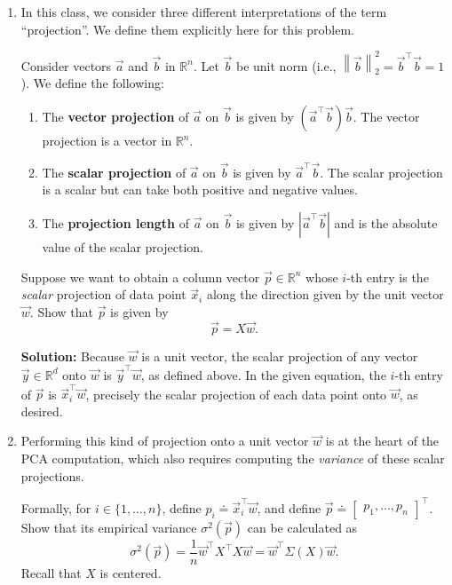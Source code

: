 \documentclass[10pt]{article}
\theoremstyle{definition}
\theoremstyle{plain}
\newcommand{\RR}{\mathbb{R}}
\begin{document}
\begin{enumerate}[label=(\alph*)]
\item In this class, we consider three different interpretations of the term ``projection''. We define them explicitly here for this problem.

Consider vectors $\vec{a}$ and $\vec{b}$ in $\RR^n$. Let $\vec{b}$ be unit norm (i.e., $\left\| \vec{b} \right\|_2^2 = \vec{b}^\top \vec{b} = 1$). We define the following:
\begin{enumerate}[label=\roman*.]
\item The \textbf{vector projection} of $\vec{a}$ on $\vec{b}$ is given by $(\vec{a}^\top \vec{b})\vec{b}$. The vector projection is a vector in $\RR^n$.
\item The \textbf{scalar projection} of $\vec{a}$ on $\vec{b}$ is given by $\vec{a}^\top \vec{b}$. The scalar projection is a scalar but can take both positive and negative values.
\item The \textbf{projection length} of $\vec{a}$ on $\vec{b}$ is given by $\left| \vec{a}^\top \vec{b} \right|$ and is the absolute value of the scalar projection.
\end{enumerate}

Suppose we want to obtain a column vector $\vec{p} \in \RR^n$ whose $i$-th entry is the \textit{scalar} projection of data point $\vec{x}_i$ along the direction given by the unit vector $\vec{w}$. Show that $\vec{p}$ is given by
\begin{equation}
\vec{p} = X\vec{w}.
\end{equation}

\textbf{Solution:} Because $\vec{w}$ is a unit vector, the scalar projection of any vector $\vec{y} \in \RR^d$ onto $\vec{w}$ is $\vec{y}^\top \vec{w}$, as defined above. In the given equation, the $i$-th entry of $\vec{p}$ is $\vec{x}_i^\top \vec{w}$, precisely the scalar projection of each data point onto $\vec{w}$, as desired.

\item Performing this kind of projection onto a unit vector $\vec{w}$ is at the heart of the PCA computation, which also requires computing the \textit{variance} of these scalar projections.

Formally, for $i \in \{1, \ldots, n\}$, define $p_i \doteq \vec{x}_i^\top \vec{w}$, and define $\vec{p} \doteq \begin{bmatrix} p_1, \ldots, p_n \end{bmatrix}^\top$. Show that its empirical variance $\sigma^2(\vec{p})$ can be calculated as
\begin{equation}
\sigma^2(\vec{p}) = \frac{1}{n} \vec{w}^\top X^\top X \vec{w} = \vec{w}^\top \Sigma(X) \vec{w}.
\end{equation}
Recall that $X$ is centered.


\end{enumerate}
\end{document}
